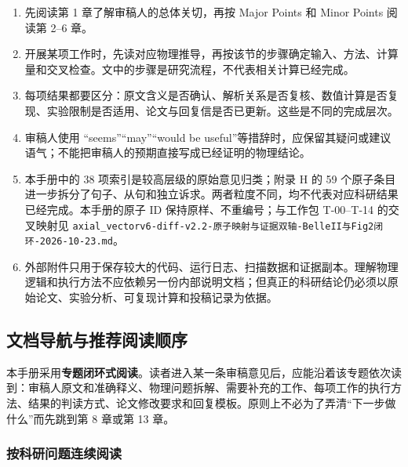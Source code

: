 \documentclass[
]{article}
\providecommand{\tightlist}{%
  \setlength{\itemsep}{0pt}\setlength{\parskip}{0pt}}
\begin{document}
\begin{enumerate}
\def\labelenumi{\arabic{enumi}.}
\tightlist
\item
  先阅读第 1 章了解审稿人的总体关切，再按 Major Points 和 Minor Points
  阅读第 2--6 章。
\item
  开展某项工作时，先读对应物理推导，再按该节的步骤确定输入、方法、计算量和交叉检查。文中的步骤是研究流程，不代表相关计算已经完成。
\item
  每项结果都要区分：原文含义是否确认、解析关系是否复核、数值计算是否复现、实验限制是否适用、论文与回复信是否已更新。这些是不同的完成层次。
\item
  审稿人使用 ``seems''``may''``would be
  useful''等措辞时，应保留其疑问或建议语气；不能把审稿人的预期直接写成已经证明的物理结论。
\item
  本手册中的 38 项索引是较高层级的原始意见归类；附录 H 的 59
  个原子条目进一步拆分了句子、从句和独立诉求。两者粒度不同，均不代表对应科研结果已经完成。本手册的原子
  ID 保持原样、不重编号；与工作包 T-00--T-14 的交叉映射见
  \texttt{axial\_vectorv6-diff-v2.2-原子映射与证据双轴-BelleII与Fig2闭环-2026-10-23.md}。
\item
  外部附件只用于保存较大的代码、运行日志、扫描数据和证据副本。理解物理逻辑和执行方法不应依赖另一份内部说明文档；但真正的科研结论仍必须以原始论文、实验分析、可复现计算和投稿记录为依据。
\end{enumerate}

\subsection{文档导航与推荐阅读顺序}\label{ux6587ux6863ux5bfcux822aux4e0eux63a8ux8350ux9605ux8bfbux987aux5e8f}

本手册采用\textbf{专题闭环式阅读}。读者进入某一条审稿意见后，应能沿着该专题依次读到：审稿人原文和准确释义、物理问题拆解、需要补充的工作、每项工作的执行方法、结果的判读方式、论文修改要求和回复模板。原则上不必为了弄清``下一步做什么''而先跳到第
8 章或第 13 章。

\subsubsection{按科研问题连续阅读}\label{ux6309ux79d1ux7814ux95eeux9898ux8fdeux7eedux9605ux8bfb}
\end{document}
